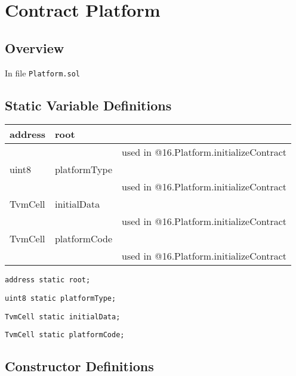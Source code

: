 
\chapter{Contract Platform}

\minitoc

\section{Overview}


In file {\tt Platform.sol}

\section{Static Variable Definitions}


\ifsoltables
\noindent\begin{tabular}{|l|l|p{5cm}|}\hline
address & root &  \\\hline
 & & used in @16.Platform.initializeContract\\\hline
uint8 & platformType &  \\\hline
 & & used in @16.Platform.initializeContract\\\hline
TvmCell & initialData &  \\\hline
 & & used in @16.Platform.initializeContract\\\hline
TvmCell & platformCode &  \\\hline
 & & used in @16.Platform.initializeContract\\\hline
\end{tabular}
\fi


\begin{lstlisting}[firstnumber=8]
    address static root;
\end{lstlisting}

\begin{lstlisting}[firstnumber=9]
    uint8 static platformType;
\end{lstlisting}

\begin{lstlisting}[firstnumber=10]
    TvmCell static initialData;
\end{lstlisting}

\begin{lstlisting}[firstnumber=11]
    TvmCell static platformCode;
\end{lstlisting}

\section{Constructor Definitions}


